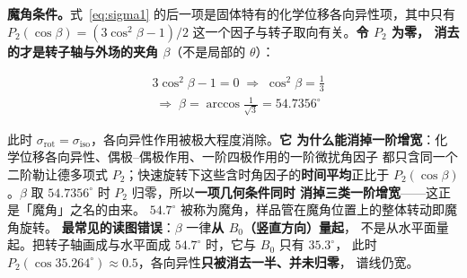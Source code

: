 \begin{principle}
\textbf{魔角条件。}式~\eqref{eq:sigma1} 的后一项是固体特有的化学位移各向异性项，其中只有
$P_2(\cos\beta)=(3\cos^{2}\beta-1)/2$ 这一个因子与转子取向有关。\textbf{令 $P_2$ 为零，
消去的才是转子轴与外场的夹角 $\beta$}（不是局部的 $\theta$）：

\begin{equation}
\label{eq:magic}
\begin{aligned}
&3\cos^{2}\beta-1=0
\;\Longrightarrow\;\cos^{2}\beta=\tfrac{1}{3}\\
&\;\Longrightarrow\;\beta=\arccos\tfrac{1}{\sqrt{3}}=54.7356^\circ
\end{aligned}
\end{equation}

此时 $\sigma_{\mathrm{rot}}=\sigma_{\mathrm{iso}}$，各向异性作用被极大程度消除。\textbf{它
为什么能消掉一阶增宽}：化学位移各向异性、偶极--偶极作用、一阶四极作用的一阶微扰角因子
都只含同一个二阶勒让德多项式 $P_2$；快速旋转下这些含时角因子的\textbf{时间平均}正比于
$P_2(\cos\beta)$。$\beta$ 取 $54.7356^\circ$ 时 $P_2$ 归零，所以\textbf{一项几何条件同时
消掉三类一阶增宽}——这正是「魔角」之名的由来。
$54.7^\circ$ 被称为魔角，样品管在魔角位置上的整体转动即魔角旋转。
\textbf{最常见的读图错误}：$\beta$ 一律\textbf{从 $B_0$（竖直方向）量起}，
不是从水平面量起。把转子轴画成与水平面成 $54.7^\circ$ 时，它与 $B_0$ 只有 $35.3^\circ$，
此时 $P_2(\cos 35.264^\circ)\approx0.5$，各向异性\textbf{只被消去一半、并未归零}，
谱线仍宽。
\end{principle}

